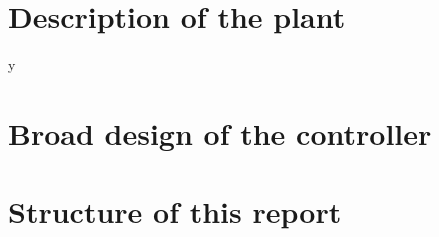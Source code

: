 

\section{Description of the plant}y

\section{Broad design of the controller}

\section{Structure of this report}